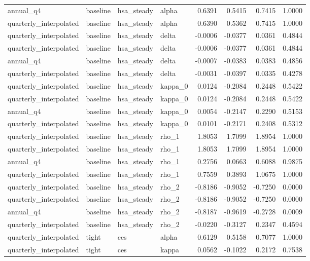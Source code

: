 \begin{tabular}{llllrrrr}
annual\_q4 & baseline & hsa\_steady & alpha & 0.6391 & 0.5415 & 0.7415 & 1.0000 \\
quarterly\_interpolated & baseline & hsa\_steady & alpha & 0.6390 & 0.5362 & 0.7415 & 1.0000 \\
quarterly\_interpolated & baseline & hsa\_steady & delta & -0.0006 & -0.0377 & 0.0361 & 0.4844 \\
quarterly\_interpolated & baseline & hsa\_steady & delta & -0.0006 & -0.0377 & 0.0361 & 0.4844 \\
annual\_q4 & baseline & hsa\_steady & delta & -0.0007 & -0.0383 & 0.0383 & 0.4856 \\
quarterly\_interpolated & baseline & hsa\_steady & delta & -0.0031 & -0.0397 & 0.0335 & 0.4278 \\
quarterly\_interpolated & baseline & hsa\_steady & kappa\_0 & 0.0124 & -0.2084 & 0.2448 & 0.5422 \\
quarterly\_interpolated & baseline & hsa\_steady & kappa\_0 & 0.0124 & -0.2084 & 0.2448 & 0.5422 \\
annual\_q4 & baseline & hsa\_steady & kappa\_0 & 0.0054 & -0.2147 & 0.2290 & 0.5153 \\
quarterly\_interpolated & baseline & hsa\_steady & kappa\_0 & 0.0101 & -0.2171 & 0.2408 & 0.5312 \\
quarterly\_interpolated & baseline & hsa\_steady & rho\_1 & 1.8053 & 1.7099 & 1.8954 & 1.0000 \\
quarterly\_interpolated & baseline & hsa\_steady & rho\_1 & 1.8053 & 1.7099 & 1.8954 & 1.0000 \\
annual\_q4 & baseline & hsa\_steady & rho\_1 & 0.2756 & 0.0663 & 0.6088 & 0.9875 \\
quarterly\_interpolated & baseline & hsa\_steady & rho\_1 & 0.7559 & 0.3893 & 1.0675 & 1.0000 \\
quarterly\_interpolated & baseline & hsa\_steady & rho\_2 & -0.8186 & -0.9052 & -0.7250 & 0.0000 \\
quarterly\_interpolated & baseline & hsa\_steady & rho\_2 & -0.8186 & -0.9052 & -0.7250 & 0.0000 \\
annual\_q4 & baseline & hsa\_steady & rho\_2 & -0.8187 & -0.9619 & -0.2728 & 0.0009 \\
quarterly\_interpolated & baseline & hsa\_steady & rho\_2 & -0.0220 & -0.3127 & 0.2347 & 0.4594 \\
quarterly\_interpolated & tight & ces & alpha & 0.6129 & 0.5158 & 0.7077 & 1.0000 \\
quarterly\_interpolated & tight & ces & kappa & 0.0562 & -0.1022 & 0.2172 & 0.7538 \\

\end{tabular}

